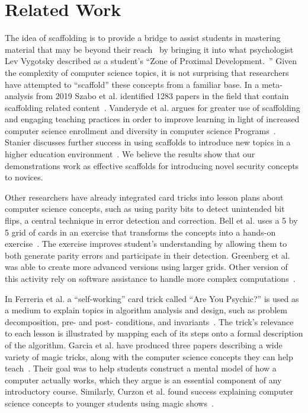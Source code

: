 \section{Related Work}
\label{SEC:related-work}

The idea of scaffolding is to provide a bridge to assist students
in mastering material that may be beyond their reach~\cite{wood1976role}
by bringing it into what psychologist Lev Vygotsky described as a student's
``Zone of Proximal Development.~\cite{vygotsky1978}''  Given the complexity of computer science
topics, it is not surprising that researchers have attempted to ``scaffold''
these concepts from a familiar base.  In a meta-analysis from 2019 Szabo et al.
identified 1283 papers in the field that contain scaffolding related
content~\cite{szabometa}.
Vanderyde et al. argues for greater use of scaffolding and engaging teaching
practices in order to improve learning in light of increased computer science
enrollment and diversity in computer science
Programs~\cite{vanderhydescaffolding}.  Stanier discusses
further success in using scaffolds to introduce new topics in a higher education
environment~\cite{stanierhighered}.
We believe the results show that our demonstrations work as
effective scaffolds for introducing novel security concepts to novices.

Other researchers have already integrated card tricks into lesson plans about
computer science concepts, such as using parity bits to detect unintended bit
flips, a central technique in error detection and correction.  Bell et al. uses a
5 by 5 grid of cards in an exercise that transforms the concepts into a hands-on
exercise~\cite{bell2009computer, csunplugged}.
The exercise improves student's understanding by allowing them to
both generate parity errors and participate in their detection.  Greenberg et
al. was able to create more advanced versions using larger grids.  Other version
of this activity rely on software assistance to handle more complex
computations~\cite{Greenberg2017, Greenberg2018}.

In Ferreria et al. a ``self-working'' card trick called ``Are You Psychic?''
is used
as a medium to explain topics in algorithm analysis and design, such as problem
decomposition, pre- and post- conditions, and
invariants~\cite{ferreira2014magic}.
The trick's relevance
to each lesson is illustrated by mapping each of its steps onto a formal
description of the algorithm.  Garcia et al. have produced three papers describing
a wide variety of magic tricks, along with the computer science concepts they
can help teach~\cite{garcia2012demystifying,
garcia2013demystifying,
garcia2016demystifying}.
Their goal was to help students construct a mental model of how
a computer actually works, which they argue is an essential component of any
introductory course.  Similarly, Curzon et al. found success explaining computer
science concepts to younger students using magic shows~\cite{curzon2008engaging}.


